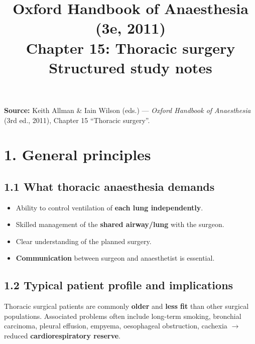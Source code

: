 \documentclass[11pt,a4paper]{article}
\title{Oxford Handbook of Anaesthesia (3e, 2011)\\Chapter 15: Thoracic surgery\\Structured study notes}
\author{}
\date{}
\begin{document}
\maketitle

\noindent\textbf{Source:} Keith Allman \& Iain Wilson (eds.) --- \emph{Oxford Handbook of Anaesthesia} (3rd ed., 2011), Chapter 15 ``Thoracic surgery''.

\tableofcontents

\section{1. General principles}

\subsection{1.1 What thoracic anaesthesia demands}
\begin{itemize}[leftmargin=*, itemsep=2pt]
  \item Ability to control ventilation of \textbf{each lung independently}.
  \item Skilled management of the \textbf{shared airway/lung} with the surgeon.
  \item Clear understanding of the planned surgery.
  \item \textbf{Communication} between surgeon and anaesthetist is essential.
\end{itemize}

\subsection{1.2 Typical patient profile and implications}
Thoracic surgical patients are commonly \textbf{older} and \textbf{less fit} than other surgical populations. Associated problems often include long-term smoking, bronchial carcinoma, pleural effusion, empyema, oesophageal obstruction, cachexia \(\rightarrow\) reduced \textbf{cardiorespiratory reserve}.
\end{document}
